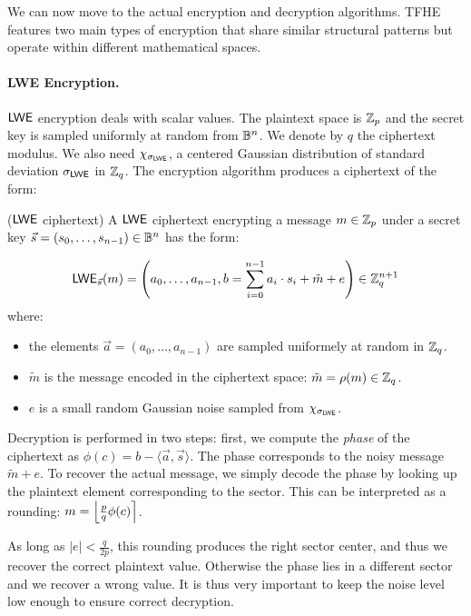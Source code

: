 We can now move to the actual encryption and decryption algorithms. TFHE features two main types of encryption that share similar structural patterns but operate within different mathematical spaces.

\paragraph{LWE Encryption.}
$\textsf{LWE}$ encryption deals with scalar values. The plaintext space is $\mathbb{Z}_p$ and the secret key is sampled uniformly at random from $\mathbb{B}^n$. We denote by $q$ the ciphertext modulus. We also need 
$\chi_{\sigma_{\textsf{LWE}}}$, a centered Gaussian distribution of standard deviation $\sigma_{\textsf{LWE}}$ in $\mathbb{Z}_q$. The encryption algorithm produces a ciphertext of the form:

\begin{definition}($\textsf{LWE}$ ciphertext)
	A $\textsf{LWE}$ ciphertext encrypting a message $m \in \mathbb{Z}_p$ under a secret key $\vec s=(s_0, \dots, s_{n-1}) \in \mathbb{B}^n$ has the form:
	
	\begin{equation}
		\textsf{LWE}_{\vec s}(m) = \left (a_0, \dots, a_{n-1}, b = \sum_{i=0}^{n-1} a_i \cdot s_i + \tilde m + e \right ) \in \mathbb{Z}_q^{n+1}
	\end{equation}
	where:
	\begin{itemize}
		\item the elements $\vec a = (a_0, \dots, a_{n-1})$ are sampled uniformely at random in $\mathbb{Z}_q$.
		\item $\tilde m$ is the message encoded in the ciphertext space: $\tilde m = \rho(m) \in \mathbb{Z}_q$.
		\item $e$ is a small random Gaussian noise sampled from $\chi_{\sigma_{\textsf{LWE}}}$.
	\end{itemize}
\end{definition}


Decryption is performed in two steps: first, we compute the \emph{phase} of the ciphertext as $\phi(c) = b - \langle \vec a, \vec s\rangle$. The phase corresponds to the noisy message $\tilde{m} + e$. To recover the actual message, we simply decode the phase by looking up the plaintext element corresponding to the sector. This can be interpreted as a rounding: $m = \left \lfloor \frac p q \phi(c) \right \rceil$. 

As long as $|e| < \frac{q}{2p}$, this rounding produces the right sector center, and thus we recover the correct plaintext value. Otherwise the phase lies in a different sector and we recover a wrong value. It is thus very important to keep the noise level low enough to ensure correct decryption.


